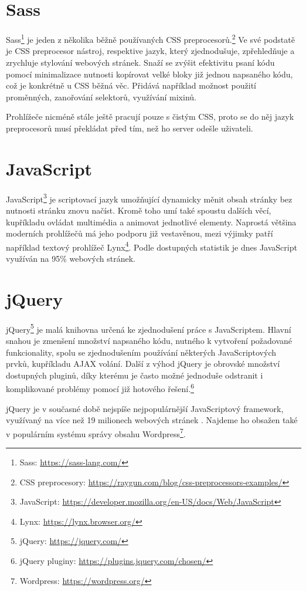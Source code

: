 \section{Sass}
Sass\footnote{Sass: \url{https://sass-lang.com/}} je jeden z několika běžně používaných CSS preprocesorů.\footnote{CSS preprocesory: \url{https://raygun.com/blog/css-preprocessors-examples/}} Ve své podstatě je CSS preprocesor nástroj, respektive jazyk, který zjednodušuje, zpřehledňuje a zrychluje stylování webových stránek. Snaží se zvýšit efektivitu psaní kódu pomocí minimalizace nutnosti kopírovat velké bloky již jednou napsaného kódu, což je konkrétně u CSS běžná věc. Přidává například možnost použití proměnných, zanořování selektorů, využívání mixinů. 
\par Prohlížeče nicméně stále ještě pracují pouze s čistým CSS, proto se do něj jazyk preprocesorů musí překládat před tím, než ho server odešle uživateli. 


\section{JavaScript}
JavaScript\footnote{JavaScript: \url{https://developer.mozilla.org/en-US/docs/Web/JavaScript}} je scriptovací jazyk umožňující dynamicky měnit obsah stránky bez nutnosti stránku znovu načíst. Kromě toho umí také spoustu dalších věcí, kupříkladu ovládat multimédia a animovat jednotlivé elementy. Naprostá většina moderních prohlížečů má jeho podporu již vestavěnou, mezi výjimky patří například textový prohlížeč Lynx\footnote{Lynx: \url{https://lynx.browser.org/}}. Podle dostupných statistik \cite{JAVASCRIPT-USAGE} je dnes JavaScript využíván na 95\% webových stránek.

\section{jQuery}
jQuery\footnote{jQuery: \url{https://jquery.com/}} je malá knihovna určená ke zjednodušení práce s JavaScriptem. Hlavní snahou je zmenšení množství napsaného kódu, nutného k vytvoření požadované funkcionality, spolu se zjednodušením používání některých JavaScriptových prvků, kupříkladu AJAX volání. \cite{JQUERY} Další z výhod jQuery je obrovské množství dostupných pluginů, díky kterému je často možné jednoduše odstranit i komplikované problémy pomocí již hotového řešení.\footnote{jQuery pluginy: \url{https://plugins.jquery.com/chosen/}}  
\par jQuery je v současné době nejspíše nejpopulárnější JavaScriptový framework, využívaný na více než 19 milionech webových stránek \cite{JQUERY-USAGE}. Najdeme ho obsažen také v populárním systému správy obsahu Wordpress\footnote{Wordpress: \url{https://wordpress.org/}}.

